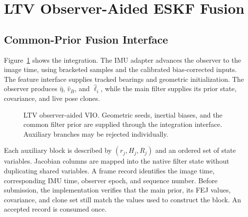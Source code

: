 \documentclass[a4paper,runningheads,twocolumn]{llncs}
\begin{document}
\section{LTV Observer-Aided ESKF Fusion}
\subsection{Common-Prior Fusion Interface}
Figure~\ref{fig:framework} shows the integration. The IMU adapter advances the observer to the image time, using bracketed samples and the calibrated bias-corrected inputs. The feature interface supplies tracked bearings and geometric initialization. The observer produces $\hat\eta$, $\hat v_B$, and $\hat\ell_i$, while the main filter supplies its prior state, covariance, and live pose clones.

\begin{figure}[t]
\centering
{}
\caption{LTV observer-aided VIO. Geometric seeds, inertial biases, and the common filter prior are supplied through the integration interface. Auxiliary branches may be rejected individually.}
\label{fig:framework}
\end{figure}

Each auxiliary block is described by $(r_j,H_j,R_j)$ and an ordered set of state variables. Jacobian columns are mapped into the native filter state without duplicating shared variables. A frame record identifies the image time, corresponding IMU time, observer epoch, and sequence number. Before submission, the implementation verifies that the main prior, its FEJ values, covariance, and clone set still match the values used to construct the block. An accepted record is consumed once.
\end{document}
